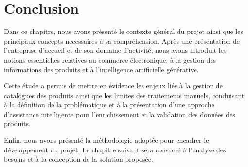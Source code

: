 




\section{Conclusion}

Dans ce chapitre, nous avons présenté le contexte général du projet ainsi que les principaux concepts nécessaires à sa compréhension. Après une présentation de l'entreprise d'accueil et de son domaine d'activité, nous avons introduit les notions essentielles relatives au commerce électronique, à la gestion des informations des produits et à l'intelligence artificielle générative.

Cette étude a permis de mettre en évidence les enjeux liés à la gestion de catalogues des produits ainsi que les limites des traitements manuels, conduisant à la définition de la problématique et à la présentation d'une approche d'assistance intelligente pour l'enrichissement et la validation des données des produits.

Enfin, nous avons présenté la méthodologie adoptée pour encadrer le développement du projet. Le chapitre suivant sera consacré à l'analyse des besoins et à la conception de la solution proposée.

